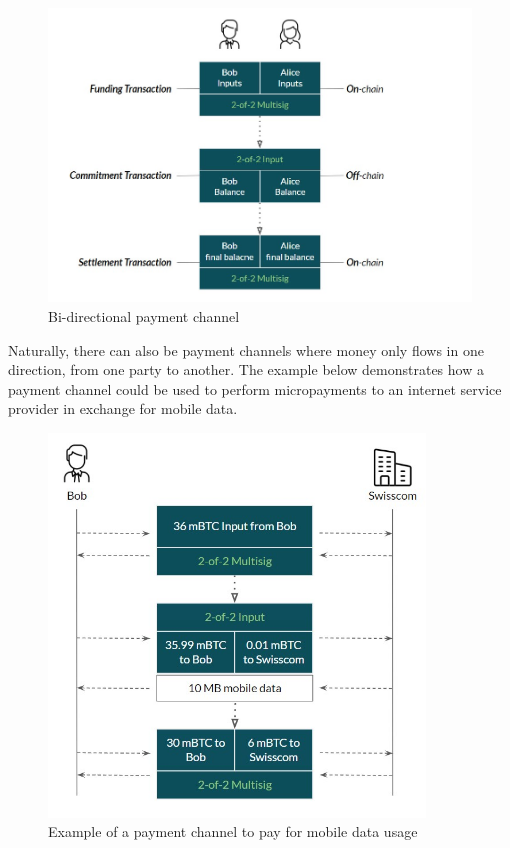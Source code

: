 \documentclass[a4paper, 12pt]{report}
\begin{document}
\begin{figure}[h]
	\centering
	\includegraphics[width=13cm]{04_Bidirectional_Channel}
	\caption{Bi-directional payment channel}
	\label{fig:04_Bidirectional_Channel}
\end{figure}

\par Naturally, there can also be payment channels where money only flows in one direction, from one party to another. The example below demonstrates how a payment channel could be used to perform micropayments to an internet service provider in exchange for mobile data.

\begin{figure}[h]
	\centering
	\includegraphics[width=10cm]{05_Onedirectional_Channel}
	\caption{Example of a payment channel to pay for mobile data usage}
	\label{fig:05_Onedirectional_Channel}
\end{figure}
\end{document}
